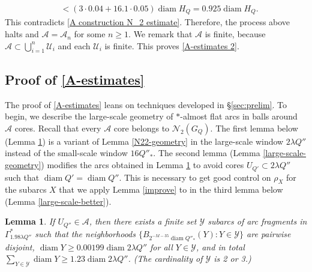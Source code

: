 \documentclass[12pt]{amsart}
\numberwithin{equation}{section}
\theoremstyle{plain}
\newtheorem{lemma}[theorem]{Lemma}
\theoremstyle{definition}
\newcommand{\diam}{\mathop\mathrm{diam}\nolimits}
\numberwithin{figure}{section}
\begin{document}
\begin{align*}
&<(3\cdot 0.04 + 16.1\cdot 0.05)\diam H_Q=0.925\diam H_Q. \end{align*} This contradicts \eqref{A construction N_2 estimate}. Therefore, the process above halts and $\mathcal{A}=\mathcal{A}_n$ for some $n\geq 1$. We remark that $\mathcal{A}$ is finite, because $\mathcal{A}\subset\bigcup_{i=1}^n \mathcal{U}_i$ and each $\mathcal{U}_i$ is finite. This proves \eqref{A-estimates 2}.

\subsection{Proof of \eqref{A-estimates}} \label{ss:large-scale}

The proof of \eqref{A-estimates} leans on techniques developed in \S\ref{sec:prelim}. To begin, we describe the large-scale geometry of $*$-almost flat arcs in balls around $\mathcal{A}$ cores. Recall that every $\mathcal{A}$ core belongs to $\mathcal{N}_2(G_Q)$. The first lemma below (Lemma \ref{A-geometry}) is a variant of Lemma \ref{N22-geometry} in the large-scale window $2\lambda Q''$ instead of the small-scale window $16Q''_*$. The second lemma (Lemma \ref{large-scale-geometry}) modifies the arcs obtained in Lemma \ref{A-geometry} to avoid cores $U_{Q'} \subset 2\lambda Q''$ such that $\diam Q' = \diam Q''$. This is necessary to get good control on \hyperref[e:r_T def]{$\rho_{X}$}  for the subarcs $X$ that we apply Lemma \ref{improve} to in the third lemma below (Lemma \ref{large-scale-better}).

\begin{lemma}\label{A-geometry} If $U_{Q''}\in\mathcal{A}$, then there exists a finite set $\mathcal{Y}$ subarcs of arc fragments in $\Gamma^*_{1.98\lambda Q''}$ such that the neighborhoods $\{B_{2^{-M-35}\diam Q''_*}(Y) : Y\in\mathcal{Y}\}$ are pairwise disjoint, $\diam Y\geq 0.00199 \diam 2\lambda Q''$ for all $Y\in\mathcal{Y}$, and in total $\sum_{Y\in\mathcal{Y}} \diam Y \geq 1.23\diam 2\lambda Q''$. (The cardinality of $\mathcal{Y}$ is 2 or 3.)
\end{lemma}
\end{document}
